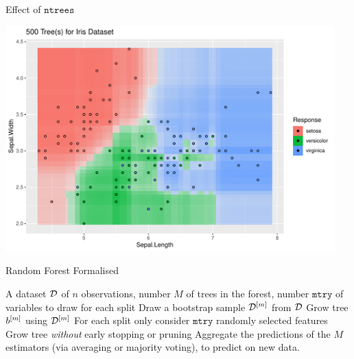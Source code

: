 \documentclass[11pt,compress,t,notes=noshow, xcolor=table]{beamer}
\begin{document}
\begin{vbframe}{Effect of $\texttt{ntrees}$}
\begin{knitrout}
{\centering \includegraphics[width=0.95\textwidth]{figure/cart_forest_intro_3} 

}
\end{knitrout}
\end{vbframe}

\begin{vbframe}{Random Forest Formalised}
  \begin{algorithm}[H]
  \caption*{Random Forest algorithm}
  \begin{algorithmic}[1]
  A dataset $\mathcal{D}$ of $n$ observations, number $M$ of trees
  in the forest, number $\texttt{mtry}$ of variables to draw for each split
  \State Draw a bootstrap sample $\mathcal{D}^{[m]}$ from $\mathcal{D}$
  \State Grow tree $b^{[m]}$ using $\mathcal{D}^{[m]}$
  \State For each split only consider $\texttt{mtry}$ randomly selected features
  \State Grow tree \textit{without} early stopping or pruning
\EndFor
\State Aggregate the predictions of the $M$ estimators (via averaging or majority voting), to predict on new data.
\end{algorithmic}
\end{algorithm}
\end{vbframe}

\endlecture
\end{document}
